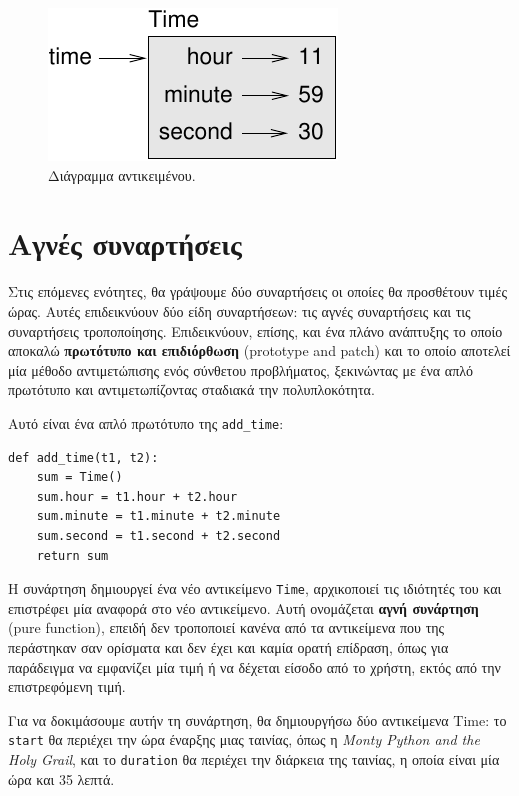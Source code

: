 \documentclass[10pt]{book}
\begin{document}
\begin{figure}
\centerline
{\includegraphics[scale=0.8]{figs/time.pdf}}
 \caption{Διάγραμμα αντικειμένου.}  
\label{fig.time}
\end{figure}


 
\section{Αγνές συναρτήσεις}

Στις επόμενες ενότητες, θα γράψουμε δύο συναρτήσεις οι οποίες θα προσθέτουν τιμές ώρας. Αυτές επιδεικνύουν δύο
είδη συναρτήσεων: τις αγνές συναρτήσεις και τις συναρτήσεις τροποποίησης. Επιδεικνύουν, επίσης, και ένα πλάνο ανάπτυξης το οποίο αποκαλώ {\bf πρωτότυπο και επιδιόρθωση} (prototype and patch) και το οποίο αποτελεί μία
μέθοδο αντιμετώπισης ενός σύνθετου προβλήματος, ξεκινώντας με ένα απλό πρωτότυπο και αντιμετωπίζοντας σταδιακά
την πολυπλοκότητα.

Αυτό είναι ένα απλό πρωτότυπο της \verb"add_time":

\begin{verbatim}
def add_time(t1, t2):
    sum = Time()
    sum.hour = t1.hour + t2.hour
    sum.minute = t1.minute + t2.minute
    sum.second = t1.second + t2.second
    return sum
\end{verbatim}
%
Η συνάρτηση δημιουργεί ένα νέο αντικείμενο {\tt Time}, αρχικοποιεί τις ιδιότητές του και επιστρέφει μία αναφορά
στο νέο αντικείμενο. Αυτή ονομάζεται {\bf αγνή συνάρτηση} (pure function), επειδή δεν τροποποιεί κανένα από
τα αντικείμενα που της περάστηκαν σαν ορίσματα και δεν έχει και καμία ορατή επίδραση, όπως για παράδειγμα
να εμφανίζει μία τιμή ή να δέχεται είσοδο από το χρήστη, εκτός από την επιστρεφόμενη τιμή.

Για να δοκιμάσουμε αυτήν τη συνάρτηση, θα δημιουργήσω δύο αντικείμενα Time: το {\tt start} θα περιέχει την ώρα
έναρξης μιας ταινίας, όπως η {\em Monty Python and the Holy Grail}, και το {\tt duration} θα περιέχει την
διάρκεια της ταινίας, η οποία είναι μία ώρα και 35 λεπτά.
\end{document}
